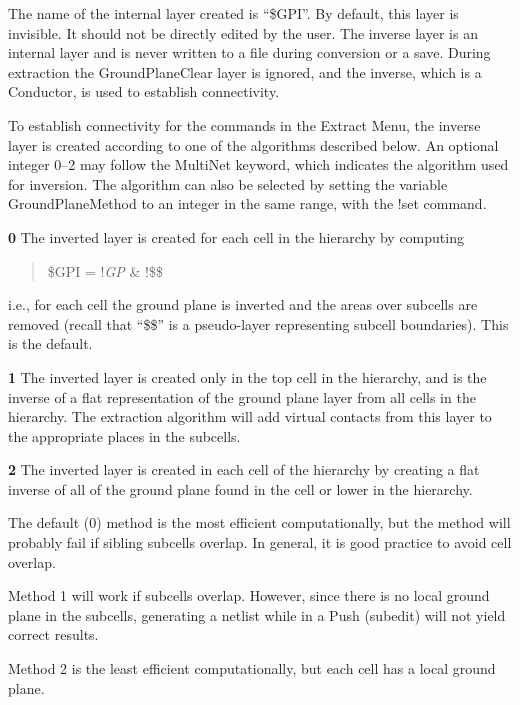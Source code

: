 \begin{description}
The name of the internal layer created is ``{\vt \$GPI}''.  By default,
this layer is invisible.  It should not be directly edited by the
user.  The inverse layer is an internal layer and is never written to
a file during conversion or a save.  During extraction the {\et
GroundPlaneClear} layer is ignored, and the inverse, which is a {\et
Conductor}, is used to establish connectivity.

To establish connectivity for the commands in the {\cb Extract Menu},
the inverse layer is created according to one of the algorithms
described below.  An optional integer 0--2 may follow the {\et
MultiNet} keyword, which indicates the algorithm used for inversion. 
The algorithm can also be selected by setting the variable {\et
GroundPlaneMethod} to an integer in the same range, with the {\cb
!set} command.

\begin{description}
\item{\bf 0}
The inverted layer is created for each cell in the hierarchy by
computing
\begin{quote}
{\vt \$GPI = !{\it GP} \& !\$\$}
\end{quote}
i.e., for each cell the ground plane is inverted and the areas over
subcells are removed (recall that ``{\vt \$\$}'' is a pseudo-layer
representing subcell boundaries).  This is the default.
\item{\bf 1}
The inverted layer is created only in the top cell in the hierarchy,
and is the inverse of a flat representation of the ground plane layer
from all cells in the hierarchy.  The extraction algorithm will add
virtual contacts from this layer to the appropriate places in the
subcells.
\item{\bf 2}
The inverted layer is created in each cell of the hierarchy by
creating a flat inverse of all of the ground plane found in the cell
or lower in the hierarchy.
\end{description}

The default (0) method is the most efficient computationally, but the
method will probably fail if sibling subcells overlap.  In general, it
is good practice to avoid cell overlap.

Method 1 will work if subcells overlap.  However, since there is no
local ground plane in the subcells, generating a netlist while in a
{\cb Push} (subedit) will not yield correct results.

Method 2 is the least efficient computationally, but each cell has a
local ground plane.


\end{description}
